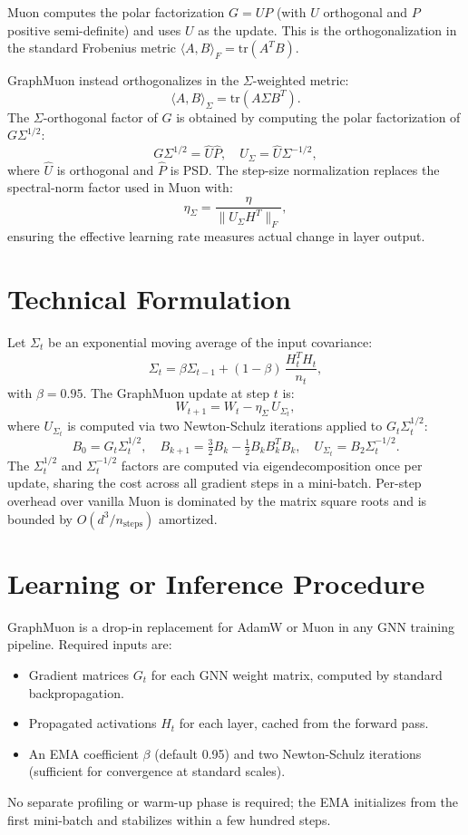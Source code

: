 \documentclass[10pt,twocolumn]{article}
\begin{document}
Muon computes the polar factorization $G = UP$ (with $U$ orthogonal and $P$
positive semi-definite) and uses $U$ as the update. This is the orthogonalization
in the standard Frobenius metric $\langle A, B \rangle_F = \text{tr}(A^T B)$.

GraphMuon instead orthogonalizes in the $\Sigma$-weighted metric:
\[
  \langle A, B \rangle_\Sigma = \text{tr}(A \Sigma B^T).
\]
The $\Sigma$-orthogonal factor of $G$ is obtained by computing the polar
factorization of $G\Sigma^{1/2}$:
\[
  G\Sigma^{1/2} = \hat{U}\hat{P}, \quad
  U_\Sigma = \hat{U}\Sigma^{-1/2},
\]
where $\hat{U}$ is orthogonal and $\hat{P}$ is PSD. The step-size normalization
replaces the spectral-norm factor used in Muon with:
\[
  \eta_\Sigma = \frac{\eta}{\|U_\Sigma H^T\|_F},
\]
ensuring the effective learning rate measures actual change in layer output.

\section{Technical Formulation}

Let $\Sigma_t$ be an exponential moving average of the input covariance:
\[
  \Sigma_t = \beta \Sigma_{t-1} + (1-\beta)\, \frac{H_t^T H_t}{n_t},
\]
with $\beta = 0.95$. The GraphMuon update at step $t$ is:
\[
  W_{t+1} = W_t - \eta_\Sigma\, U_{\Sigma_t},
\]
where $U_{\Sigma_t}$ is computed via two Newton-Schulz iterations applied to
$G_t \Sigma_t^{1/2}$:
\[
  B_0 = G_t \Sigma_t^{1/2},\quad
  B_{k+1} = \tfrac{3}{2}B_k - \tfrac{1}{2}B_k B_k^T B_k,\quad
  U_{\Sigma_t} = B_2 \Sigma_t^{-1/2}.
\]
The $\Sigma_t^{1/2}$ and $\Sigma_t^{-1/2}$ factors are computed via eigendecomposition
once per update, sharing the cost across all gradient steps in a mini-batch.
Per-step overhead over vanilla Muon is dominated by the matrix square roots
and is bounded by $O(d^3 / n_\text{steps})$ amortized.

\section{Learning or Inference Procedure}

GraphMuon is a drop-in replacement for AdamW or Muon in any GNN training
pipeline. Required inputs are:
\begin{itemize}[itemsep=2pt,parsep=0pt]
  \item Gradient matrices $G_t$ for each GNN weight matrix, computed by
    standard backpropagation.
  \item Propagated activations $H_t$ for each layer, cached from the
    forward pass.
  \item An EMA coefficient $\beta$ (default 0.95) and two Newton-Schulz
    iterations (sufficient for convergence at standard scales).
\end{itemize}
No separate profiling or warm-up phase is required; the EMA initializes from the
first mini-batch and stabilizes within a few hundred steps.
\end{document}
